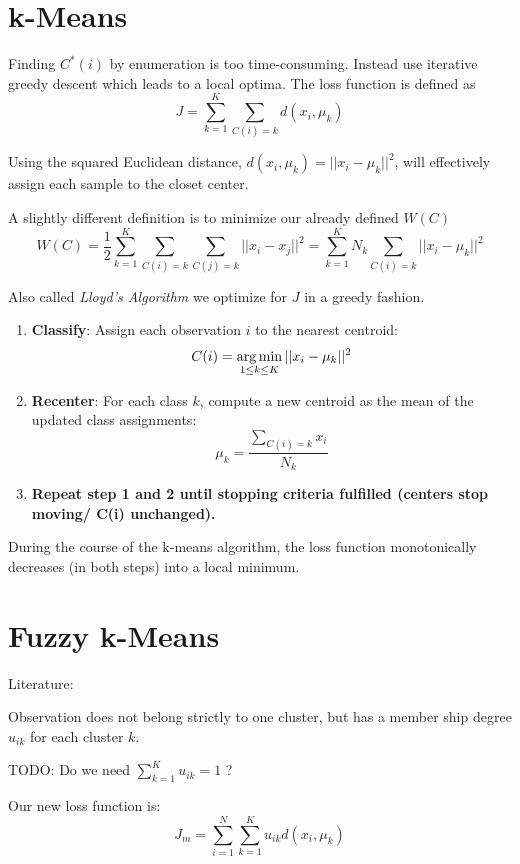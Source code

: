 \section{k-Means}
Finding $C^*(i)$ by enumeration is too time-consuming. Instead use iterative greedy descent which leads to a local optima.
The loss function is defined as
\begin{equation}
J = \sum_{k=1}^K \sum_{C(i)=k} d(x_i, \mu_k)
\end{equation}

Using the squared Euclidean distance, $d(x_i, \mu_k) = ||x_i - \mu_k||^2$, will effectively assign each sample to the closet center.

A slightly different definition is to minimize our already defined $W(C)$
\begin{equation}
W(C) = \frac{1}{2} \sum\limits_{k=1}^K \sum\limits_{C(i)=k} \sum\limits_{C(j)=k} ||x_i - x_j||^2 = \sum\limits_{k=1}^K N_k \sum\limits_{C(i)=k} ||x_i - \mu_k||^2
\end{equation}

Also called \emph{Lloyd's Algorithm} we optimize for $J$ in a greedy fashion.
\begin{enumerate}
\item \textbf{Classify}: Assign each observation $i$ to the nearest centroid: $$C(i) = \operatorname*{arg\,min}\limits_{1\leq k \leq K} ||x_i - \mu_k||^2$$
\item \textbf{Recenter}: For each class $k$, compute a new centroid as the mean of the updated class assignments: $$\mu_k = \frac{\sum\limits_{C(i)=k} x_i}{N_k}$$
\item \textbf{Repeat step 1 and 2 until stopping criteria fulfilled (\eg centers stop moving/ C(i) unchanged).}
\end{enumerate}

During the course of the k-means algorithm, the loss function monotonically decreases (in both steps) into a local minimum.

\section{Fuzzy k-Means}\label{sec:fuzzy-kmeans}
Literature: \cite{Introduction2000}

Observation does not belong strictly to one cluster, but has a member ship degree $u_{ik}$ for each cluster $k$.

TODO: Do we need $\sum_{k=1}^K u_{ik} = 1$ ?

Our new loss function is:
\begin{equation}
J_m = \sum_{i=1}^N \sum_{k=1}^K u_{ik} d(x_i, \mu_k)
\end{equation}


